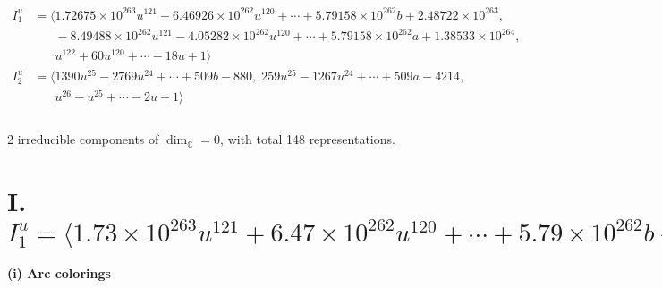 \documentclass[1p]{elsarticle_modified}
\theoremstyle{definition}
\begin{document}
\begin{align*}
I^u_{1}&=\langle 
1.72675\times10^{263} u^{121}+6.46926\times10^{262} u^{120}+\cdots+5.79158\times10^{262} b+2.48722\times10^{263},\\
\phantom{I^u_{1}}&\phantom{= \langle  }-8.49488\times10^{262} u^{121}-4.05282\times10^{262} u^{120}+\cdots+5.79158\times10^{262} a+1.38533\times10^{264},\\
\phantom{I^u_{1}}&\phantom{= \langle  }u^{122}+60 u^{120}+\cdots-18 u+1\rangle \\
I^u_{2}&=\langle 
1390 u^{25}-2769 u^{24}+\cdots+509 b-880,\;259 u^{25}-1267 u^{24}+\cdots+509 a-4214,\\
\phantom{I^u_{2}}&\phantom{= \langle  }u^{26}- u^{25}+\cdots-2 u+1\rangle \\
\\
\end{align*}
\raggedright * 2 irreducible components of $\dim_{\mathbb{C}}=0$, with total 148 representations.\\
\newpage
\renewcommand{\arraystretch}{1}
\centering \section*{I. $I^u_{1}= \langle 1.73\times10^{263} u^{121}+6.47\times10^{262} u^{120}+\cdots+5.79\times10^{262} b+2.49\times10^{263},\;-8.49\times10^{262} u^{121}-4.05\times10^{262} u^{120}+\cdots+5.79\times10^{262} a+1.39\times10^{264},\;u^{122}+60 u^{120}+\cdots-18 u+1 \rangle$}
\flushleft \textbf{(i) Arc colorings}\\
\end{document}
